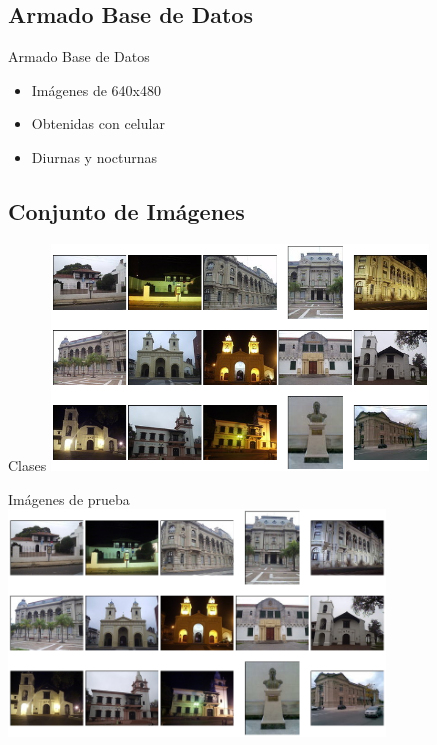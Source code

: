 \documentclass[spanish]{beamer}
\begin{document}
\section[Pruebas]{}

\subsection{Armado Base de Datos}
\begin{frame}{Armado Base de Datos}
  \begin{itemize}
  \item Imágenes de 640x480
  \item Obtenidas con celular
  \item Diurnas y nocturnas
  \end{itemize}
\end{frame}

\subsection{Conjunto de Imágenes}
\begin{frame}{Clases}
\includegraphics[width=10cm]{img/mosaico.png} 
\end{frame}

\begin{frame}{Imágenes de prueba}
\includegraphics[width=10cm]{img/pruebas.png} 
\end{frame}
\end{document}
